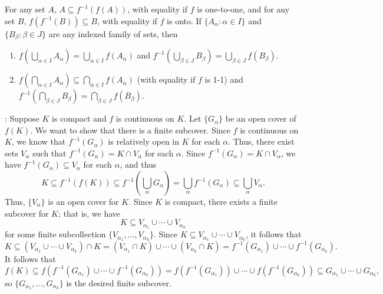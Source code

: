 \documentclass[letterpaper,12pt]{article}
\begin{document}
For any set $A$, $A\subseteq f^{-1}(f(A))$, with equality if $f$ is one-to-one, and for any set $B$, $f(f^{-1}(B))\subseteq B$, with equality if $f$ is onto. If $\{A_\alpha : \alpha\in I\}$ and $\{B_\beta : \beta\in J\}$ are any indexed family of sets, then
\begin{enumerate}
 \item $\displaystyle f\left(\bigcup_{\alpha\in I}A_\alpha\right) = \bigcup_{\alpha\in I}f(A_\alpha)$ and $\displaystyle f^{-1}\left(\bigcup_{\beta\in J}B_\beta\right) = \bigcup_{\beta\in J}f(B_\beta)$.
 \item $\displaystyle f\left(\bigcap_{\alpha\in I}A_\alpha\right) \subseteq \bigcap_{\alpha\in I}f(A_\alpha)$ (with equality if $f$ is 1-1) and $\displaystyle f^{-1}\left(\bigcap_{\beta\in J}B_\beta\right) = \bigcap_{\beta\in J}f(B_\beta)$.
\end{enumerate}

\bigskip

: Suppose $K$ is compact and $f$ is continuous on $K$. Let $\{G_\alpha\}$ be an open cover of $f(K)$. We want to show that there is a finite subcover. Since $f$ is continuous on $K$, we know that $f^{-1}(G_\alpha)$ is relatively open in $K$ for each $\alpha$. Thus, there exist sets $V_\alpha$ such that $f^{-1}(G_\alpha) = K\cap V_\alpha$ for each $\alpha$. Since $f^{-1}(G_\alpha)=K\cap V_\alpha$, we have $f^{-1}(G_\alpha)\subseteq V_\alpha$ for each $\alpha$, and thus
\[
 K\subseteq f^{-1}(f(K))\subseteq f^{-1}\left(\bigcup_\alpha G_\alpha\right) = \bigcup_\alpha f^{-1}(G_\alpha)\subseteq \bigcup_\alpha V_\alpha.
\]
Thus, $\{V_\alpha\}$ is an open cover for $K$. Since $K$ is compact, there exists a finite subcover for $K$; that is, we have
\[
 K\subseteq V_{\alpha_1}\cup \cdots \cup V_{\alpha_k}
\]
for some finite subcollection $\{V_{\alpha_1},\ldots, V_{\alpha_k}\}$. Since $K\subseteq V_{\alpha_1}\cup \cdots \cup V_{\alpha_k}$, it follows that
\[
 K\subseteq (V_{\alpha_1}\cup \cdots \cup V_{\alpha_k})\cap K = (V_{\alpha_1}\cap K)\cup\cdots\cup(V_{\alpha_k}\cap K) = f^{-1}(G_{\alpha_1})\cup\cdots\cup f^{-1}(G_{\alpha_k}).
\]
It follows that 
\[
 f(K)\subseteq f(f^{-1}(G_{\alpha_1})\cup\cdots\cup f^{-1}(G_{\alpha_k})) = f(f^{-1}(G_{\alpha_1}))\cup\cdots\cup f(f^{-1}(G_{\alpha_k}))\subseteq G_{\alpha_1}\cup\cdots\cup G_{\alpha_k},
\]
so $\{G_{\alpha_1},\ldots, G_{\alpha_k}\}$ is the desired finite subcover.
\end{document}
